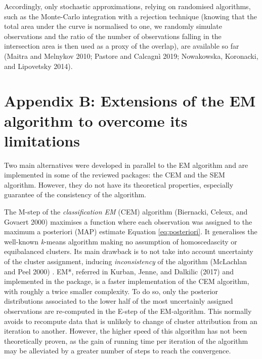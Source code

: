 Accordingly, only stochastic approximations, relying on randomised algorithms, such as the Monte-Carlo integration with a rejection technique (knowing that the total area under the curve is normalised to one, we randomly simulate observations and the ratio of the number of observations falling in the intersection area is then used as a proxy of the overlap), are available so far (Maitra and Melnykov 2010; Pastore and Calcagnì 2019; Nowakowska, Koronacki, and Lipovetsky 2014).

\hypertarget{appendix-b-extensions-of-the-em-algorithm-to-overcome-its-limitations}{%
\section{Appendix B: Extensions of the EM algorithm to overcome its limitations}\label{appendix-b-extensions-of-the-em-algorithm-to-overcome-its-limitations}}

Two main alternatives were developed in parallel to the EM algorithm and
are implemented in some of the reviewed packages: the CEM and the SEM
algorithm. However, they do not have its theoretical properties,
especially guarantee of the consistency of the algorithm.

The M-step of the \emph{classification EM} (CEM) algorithm
(Biernacki, Celeux, and Govaert 2000) maximises a function where each observation was
assigned to the maximum a posteriori (MAP) estimate Equation
\eqref{eq:posteriori}. It generalises the well-known \emph{k}-means algorithm
making no assumption of homoscedascity or equibalanced clusters. Its
main drawback is to not take into account uncertainty of the cluster
assignment, inducing \emph{inconsistency} of the algorithm
(McLachlan and Peel 2000) . EM*, referred in Kurban, Jenne, and Dalkilic (2017) and implemented
in the  package, is a faster implementation of the CEM
algorithm, with roughly a twice smaller complexity. To do so, only the
posterior distributions associated to the lower half of the most
uncertainly assigned observations are re-computed in the E-step of the
EM-algorithm. This normally avoids to recompute data that is unlikely to
change of cluster attribution from an iteration to another. However, the
higher speed of this algorithm has not been theoretically proven, as the
gain of running time per iteration of the algorithm may be alleviated by
a greater number of steps to reach the convergence.

